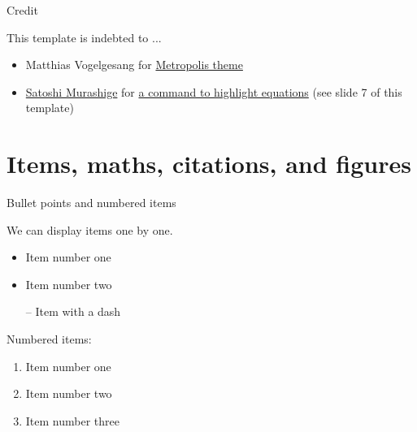 \documentclass[12pt]{beamer}
\begin{document}
\begin{frame}{Credit}

This template is indebted to ...
\begin{itemize}
    \item Matthias Vogelgesang for \href{https://github.com/matze/mtheme}{Metropolis theme}
    \item \href{https://www.eqseqs.work/}{Satoshi Murashige} for \href{https://eqseqs.hatenablog.com/entry/2019/10/11/092852}{a command to highlight equations} (see slide 7 of this template)
\end{itemize}
\end{frame}



\section{Items, maths, citations, and figures}

\begin{frame}{Bullet points and numbered items}

We can display items \alert{one by one}.

\pause

\begin{itemize}[<+->]
    \item Item \alert<2>{number one}
    \item Item \alert<3>{number two}
    \item[--] Item with a \alert<4>{dash}
\end{itemize}

\pause
Numbered items:

\begin{enumerate}[<+->]
    \item Item \alert<6>{number one}
    \item Item \alert<7>{number two}
    \item Item \alert<8>{number three}
\end{enumerate}
\end{frame}
\end{document}
